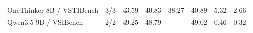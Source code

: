 \begin{table}[t]
{\begin{tabular}{lrrrrrrr}
OneThinker-8B / VSTIBench & 3/3 & 43.59 & 40.83 & 38.27 & 40.89 & 5.32 & 2.66 \\
Qwen3.5-9B / VSIBench & 2/2 & 49.25 & 48.79 & -- & 49.02 & 0.46 & 0.32 \\

\end{tabular}}
\end{table}
